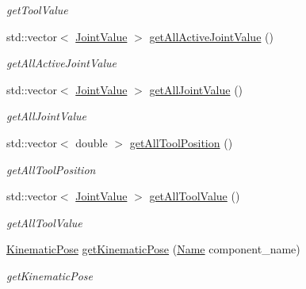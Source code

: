 \begin{DoxyCompactItemize}
\begin{DoxyCompactList}\small\item\em get\+Tool\+Value \end{DoxyCompactList}\item 
std\+::vector$<$ \hyperlink{namespacerobotis__manipulator_aa0556c98c5294ccf3a96c2d0fe315e40}{Joint\+Value} $>$ \hyperlink{classrobotis__manipulator_1_1_robotis_manipulator_a7a544fa90d43e788db23532bc330aab2}{get\+All\+Active\+Joint\+Value} ()
\begin{DoxyCompactList}\small\item\em get\+All\+Active\+Joint\+Value \end{DoxyCompactList}\item 
std\+::vector$<$ \hyperlink{namespacerobotis__manipulator_aa0556c98c5294ccf3a96c2d0fe315e40}{Joint\+Value} $>$ \hyperlink{classrobotis__manipulator_1_1_robotis_manipulator_aa9b1913956d600a58c458e47217cedfb}{get\+All\+Joint\+Value} ()
\begin{DoxyCompactList}\small\item\em get\+All\+Joint\+Value \end{DoxyCompactList}\item 
std\+::vector$<$ double $>$ \hyperlink{classrobotis__manipulator_1_1_robotis_manipulator_a7c4d0c574f879cf8919d8ce8a1ba7ea6}{get\+All\+Tool\+Position} ()
\begin{DoxyCompactList}\small\item\em get\+All\+Tool\+Position \end{DoxyCompactList}\item 
std\+::vector$<$ \hyperlink{namespacerobotis__manipulator_aa0556c98c5294ccf3a96c2d0fe315e40}{Joint\+Value} $>$ \hyperlink{classrobotis__manipulator_1_1_robotis_manipulator_acd4c2ee87fda3006165c67ce4f738625}{get\+All\+Tool\+Value} ()
\begin{DoxyCompactList}\small\item\em get\+All\+Tool\+Value \end{DoxyCompactList}\item 
\hyperlink{structrobotis__manipulator_1_1_kinematic_pose}{Kinematic\+Pose} \hyperlink{classrobotis__manipulator_1_1_robotis_manipulator_a997b8676756be7cf1cbf04645c722df9}{get\+Kinematic\+Pose} (\hyperlink{namespacerobotis__manipulator_a08c2d25e77a01ad75b9bb740f8ce4765}{Name} component\+\_\+name)
\begin{DoxyCompactList}\small\item\em get\+Kinematic\+Pose \end{DoxyCompactList}\item 

\end{DoxyCompactItemize}
